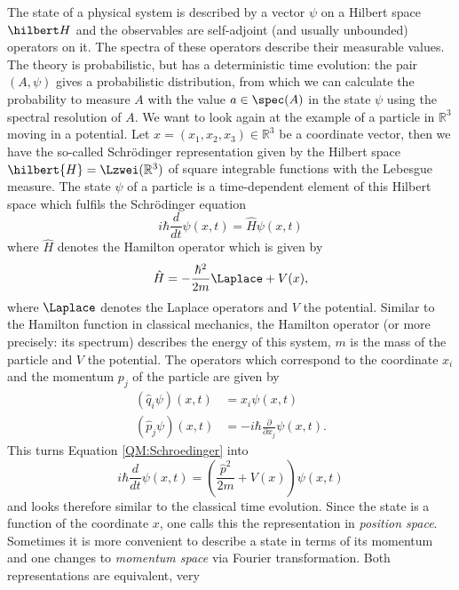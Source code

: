 The state of a physical system is described by a vector $\psi$ on a 
Hilbert space $\hilbert H$ and the observables are self-adjoint (and 
usually unbounded) operators on it. The spectra of these operators describe 
their measurable values. The theory is probabilistic, but has a deterministic 
time evolution: the pair $(A, \psi)$ gives a probabilistic distribution, 
from which we can calculate the probability to measure $A$ with the value $a 
\in \spec (A)$ in the state $\psi$ using the spectral resolution of $A$. We 
want to look again at the example of a particle in $\mathbb{R}^3$ 
moving in a potential. Let $x = (x_1, x_2, x_3) \in \mathbb{R}^3$ be a 
coordinate vector, then we have the so-called Schr\"odinger representation 
given by the Hilbert space $\hilbert{H} = \Lzwei(\mathbb{R}^3)$ of square 
integrable functions with the Lebesgue measure. The state $\psi$ of a particle 
is a time-dependent element of this Hilbert space which fulfils the 
Schr\"odinger equation
\begin{equation}
	\label{QM:Schroedinger}
	i \hbar \frac{d}{dt} \psi(x, t)
	=
	\hat{H}
	\psi(x, t)
\end{equation}
where $\hat{H}$ denotes the Hamilton operator which is given by
\begin{equation}
	\hat{H}
	=
	- \frac{\hbar^2}{2 m}
	\Laplace + V(x),
\end{equation}
where $\Laplace$ denotes the Laplace operators and $V$ the potential.
Similar to the Hamilton function in classical mechanics, the Hamilton operator 
(or more precisely: its spectrum) describes the energy of this system, $m$ is the 
mass of the particle and $V$ the potential. The operators which correspond to 
the coordinate $x_i$ and the momentum $p_j$ of the particle are given by
\begin{align*}
	\left( \hat{q}_i
	\psi \right) (x, t)
	&=
	x_i
	\psi(x, t)
	\\
	\left( \hat{p}_j
	\psi \right) (x, t)
	&=
	- i \hbar 
	\frac{\partial}{\partial x_j}
	\psi(x, t).
\end{align*}
This turns Equation \eqref{QM:Schroedinger} into
\begin{equation*}
	i \hbar \frac{d}{dt} \psi(x, t)
	=
	\left( \frac{\hat{p}^2}{2m} + V(x) \right)
	\psi(x, t)
\end{equation*}
and looks therefore similar to the classical time evolution.
Since the  state is a function of the coordinate $x$, one calls this the 
representation in \emph{position space}. Sometimes it is more convenient to 
describe a state in terms of its momentum and one changes to \emph{momentum 
space} via Fourier transformation. Both representations are equivalent, very 
